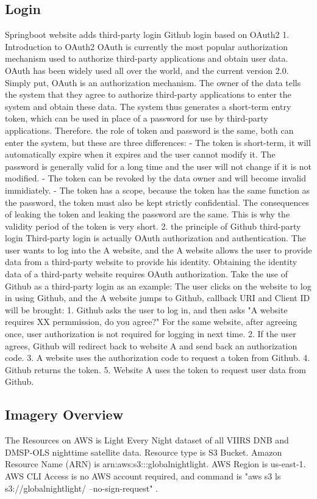\documentclass[conference]{IEEEtran}
\begin{document}
\subsection{Login}
Springboot website adds third-party login Github login based on OAuth2
1. Introduction to OAuth2
OAuth is currently the most popular authorization mechanism used to authorize third-party applications and
obtain user data. OAuth has been widely used all over the world, and the current version 2.0. Simply put,
OAuth is an authorization mechanism. The owner of the data tells the system that they agree to authorize
third-party applications to enter the system and obtain these data. The system thus generates a short-term
entry token, which can be used in place of a password for use by third-party applications. Therefore.
the role of token and password is the same, both can enter the system, but these are three differences:
- The token is short-term, it will automatically expire when it expires and the user cannot modify it.
The password is generally valid for a long time and the user will not change if it is not modified.
- The token can be revoked by the data owner and will become invalid immidiately.
- The token has a scope, because the token has the same function as the password, the token must
also be kept strictly confidential. The consequences of leaking the token and leaking the password are
the same. This is why the validity period of the token is very short.
2. the principle of Github third-party login
Third-party login is actually OAuth authorization and authentication. The user wants to log into the
A website, and the A website allows the user to provide data from a third-party website to provide his
identity. Obtaining the identity data of a third-party website requires OAuth authorization.
Take the use of Github as a third-party login as an example:
The user clicks on the website to log in using Github, and the A website jumps to Github, callback
URI and Client ID will be brought:
1. Github asks the user to log in, and then asks "A website requires XX permmission, do you agree?"
For the same website, after agreeing once, user authorization is not required for logging in next time.
2. If the user agrees, Github will redirect back to website A and send back an authorization code.
3. A website uses the authorization code to request a token from Github.
4. Github returns the token.
5. Website A uses the token to request user data from Github.

\subsection{Imagery Overview}
The Resources on AWS is Light Every Night dataset of all VIIRS DNB and DMSP-OLS nighttime satellite data. Resource type is S3 Bucket. 
Amazon Resource Name (ARN) is arn:aws:s3:::globalnightlight. AWS Region is us-east-1. AWS CLI Access is no AWS account required, and 
command is "aws s3 ls s3://globalnightlight/ --no-sign-request" \cite{WorldBan13:online}.
\end{document}
